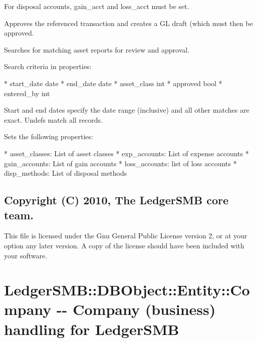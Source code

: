 \begin{description}
\begin{description}
\begin{description}
\begin{description}
\begin{description}
\begin{description}
\begin{description}
\begin{description}
\begin{description}
For disposal accounts, gain\_acct and loss\_acct must be set.



Approves the referenced transaction and creates a GL draft (which must then be 
approved.


\item[{search}] \mbox{}

Searches for matching asset reports for review and approval.



Search criteria in properties:



* start\_date date
* end\_date date
* asset\_class int
* approved bool
* entered\_by int



Start and end dates specify the date range (inclusive) and all other matches
are exact. Undefs match all records.


\item[{get\_metadata}] \mbox{}

Sets the following properties:



* asset\_classes:  List of asset classes
* exp\_accounts:  List of expense accounts
* gain\_accounts:  List of gain accounts
* loss\_accounts:  list of loss accounts
* disp\_methods:  List of disposal methods

\end{description}
\subsection*{Copyright (C) 2010, The LedgerSMB core team.\label{LedgerSMB::DBObject::Asset_Report_Copyright_C_2010_The_LedgerSMB_core_team_}}


This file is licensed under the Gnu General Public License version 2, or at your
option any later version.  A copy of the license should have been included with
your software.

\section{LedgerSMB::DBObject::Entity::Company -{}- Company (business) handling for LedgerSMB\label{LedgerSMB::DBObject::Entity::Company_-_-_Company_business_handling_for_LedgerSMB}}





\end{description}
\end{description}
\end{description}
\end{description}
\end{description}
\end{description}
\end{description}
\end{description}
